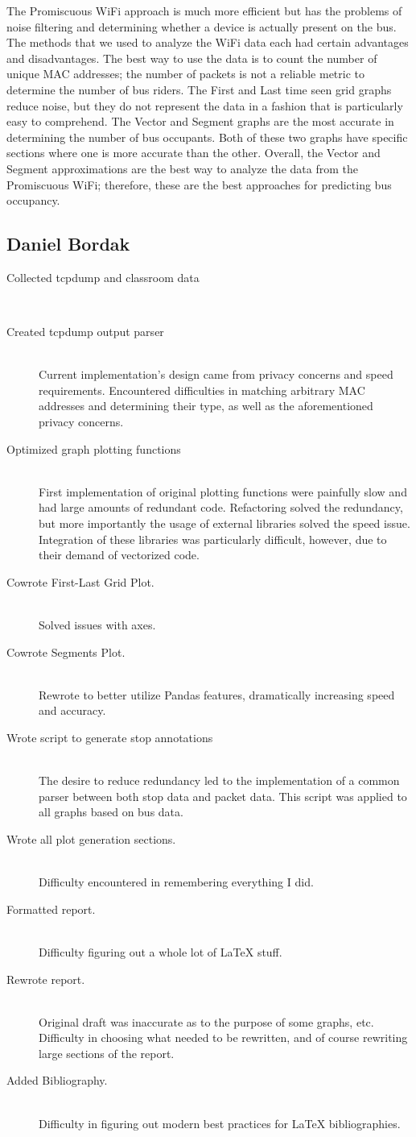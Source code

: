 \documentclass[12pt,journal,compsoc]{IEEEtran} %
\newcommand{\ditem}[2]{\item[#1] \hfill \\ #2}
\begin{document}
The Promiscuous WiFi approach is much more efficient but has the problems of noise filtering and determining whether a device is actually present on the bus.
The methods that we used to analyze the WiFi data each had certain advantages and disadvantages.
The best way to use the data is to count the number of unique MAC addresses; the number of packets is not a reliable metric to determine the number of bus riders.
The First and Last time seen grid graphs reduce noise, but they do not represent the data in a fashion that is particularly easy to comprehend.
The Vector and Segment graphs are the most accurate in determining the number of bus occupants.
Both of these two graphs have specific sections where one is more accurate than the other.
Overall, the Vector and Segment approximations are the best way to analyze the data from the Promiscuous WiFi; therefore, these are the best approaches for predicting bus occupancy.



\FloatBarrier

{}


\subsection*{Daniel Bordak}
\begin{description}
\ditem{Collected tcpdump and classroom data}{}
\ditem{Created tcpdump output parser}{
  Current implementation's design came from privacy concerns and speed requirements.
  Encountered difficulties in matching arbitrary MAC addresses and determining their type, as well as the aforementioned privacy concerns.
}
\ditem{Optimized graph plotting functions}{
  First implementation of original plotting functions were painfully slow and had large amounts of redundant code.
  Refactoring solved the redundancy, but more importantly the usage of external libraries solved the speed issue.
  Integration of these libraries was particularly difficult, however, due to their demand of vectorized code.
}
\ditem{Cowrote First-Last Grid Plot.}{
  Solved issues with axes.
}
\ditem{Cowrote Segments Plot.}{
  Rewrote to better utilize Pandas features, dramatically increasing speed and accuracy.
}
\ditem{Wrote script to generate stop annotations}{
  The desire to reduce redundancy led to the implementation of a common parser between both stop data and packet data.
  This script was applied to all graphs based on bus data.
}
\ditem{Wrote all plot generation sections.}{
  Difficulty encountered in remembering everything I did.%
}
\ditem{Formatted report.}{
  Difficulty figuring out a whole lot of \LaTeX\xspace stuff.
}
\ditem{Rewrote report.}{
  Original draft was inaccurate as to the purpose of some graphs, etc.
  Difficulty in choosing what needed to be rewritten, and of course rewriting large sections of the report.
}
\ditem{Added Bibliography.}{
  Difficulty in figuring out modern best practices for \LaTeX\xspace bibliographies.
}
\end{description}
\end{document}
